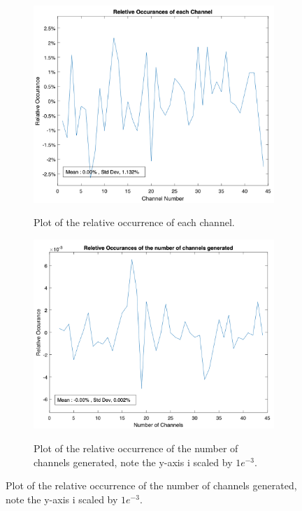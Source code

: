 \begin{figure}[h]
    \centering
    \caption{Results of 5000 dummy runs of the channel generator.}
    \label{fig:tw:dummy_runs}
    \begin{subfigure}{0.49\textwidth}
        \centering
    \caption{Plot of the relative occurrence of each channel.}
    \includegraphics[width=\textwidth]{images/technical_work/section_2_data generation/rel_occur_ch.png}
    \label{fig:tw:data_gen:rel_ch}    
    \end{subfigure}
    \begin{subfigure}{0.49\textwidth}
        \centering
        \caption{Plot of the relative occurrence of the number of channels generated, note the y-axis i scaled by $1e^{-3}$.}
        \includegraphics[width=\textwidth]{images/technical_work/section_2_data generation/rel_occur_num_ch.png}
        \label{fig:tw:data_gen:rel_num_ch}
    \end{subfigure}
\end{figure}



